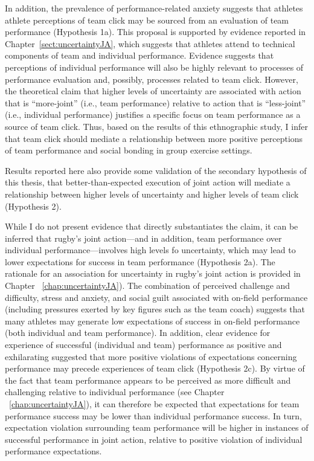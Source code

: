 \begin{CJK}{UTF8}{gbsn}
In addition, the prevalence of performance-related anxiety suggests that athletes athlete perceptions of team click may be sourced from an evaluation of team performance (Hypothesis 1a).  This proposal is supported by evidence reported in Chapter~\ref{sect:uncertaintyJA}, which suggests that athletes attend to technical components of team and individual performance. Evidence suggests that perceptions of individual performance will also be highly relevant to processes of performance evaluation and, possibly, processes related to team click.  However, the theoretical claim that higher levels of uncertainty are associated with action that is ``more-joint'' (i.e., team performance) relative to action that is ``less-joint'' (i.e., individual performance) justifies a specific focus on team performance as a source of team click. Thus, based on the results of this ethnographic study, I infer that team click should mediate a relationship between more positive perceptions of team performance and social bonding in group exercise settings.

Results reported here also provide some validation of the secondary hypothesis of this thesis, that better-than-expected execution of joint action will mediate a relationship between higher levels of uncertainty and higher levels of team click (Hypothesis 2).


While I do not present evidence that directly substantiates the claim, it can be inferred that rugby's joint action---and in addition, team performance over individual performance---involves high levels fo uncertainty, which may lead to lower expectations for success in team performance (Hypothesis 2a).  The rationale for an association for uncertainty in rugby's joint action is provided in Chapter ~\ref{chap:uncertaintyJA}).  The combination of perceived challenge and difficulty, stress and anxiety, and social guilt associated with on-field performance (including pressures exerted by key figures such as the team coach) suggests that many athletes may generate low expectations of success in on-field performance (both individual and team performance).   In addition, clear evidence for experience of successful (individual and team) performance as positive and exhilarating suggested that more positive violations of expectations concerning performance may precede experiences of team click (Hypothesis 2c).  By virtue of the fact that team performance appears to be perceived as more difficult and challenging relative to individual performance (see Chapter ~\ref{chap:uncertaintyJA}), it can therefore be expected that expectations for team performance success may be lower than individual performance success. In turn, expectation violation surrounding team performance will be higher in instances of successful performance in joint action, relative to positive violation of individual performance expectations.


\end{CJK}
